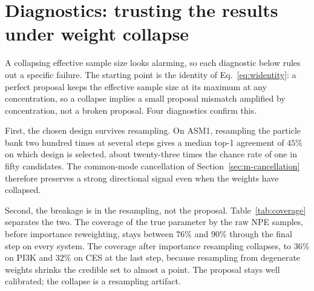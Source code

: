 \section{Diagnostics: trusting the results under weight collapse}
\label{sec:r-diag}

A collapsing effective sample size looks alarming, so each diagnostic below rules out a
specific failure. The starting point is the identity of Eq.~\eqref{eq:widentity}: a
perfect proposal keeps the effective sample size at its maximum at any concentration,
so a collapse implies a small proposal mismatch amplified by concentration, not a
broken proposal. Four diagnostics confirm this.

First, the chosen design survives resampling. On ASM1, resampling the particle bank two
hundred times at several steps gives a median top-1 agreement of $45\%$ on which design
is selected, about twenty-three times the chance rate of one in fifty candidates. The
common-mode cancellation of Section~\ref{sec:m-cancellation} therefore preserves a
strong directional signal even when the weights have collapsed.

Second, the breakage is in the resampling, not the proposal. Table~\ref{tab:coverage}
separates the two. The coverage of the true parameter by the raw NPE samples, before
importance reweighting, stays between $76\%$ and $90\%$ through the final step on every
system. The coverage after importance resampling collapses, to $36\%$ on PI3K and
$32\%$ on CES at the last step, because resampling from degenerate weights shrinks the
credible set to almost a point. The proposal stays well calibrated; the collapse is a
resampling artifact.

